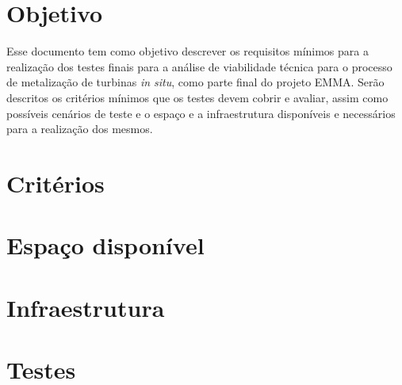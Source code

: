 \documentclass[12pt,a4paper]{article}
\begin{document}


\tableofcontents


\section{Objetivo}
Esse documento tem como objetivo descrever os requisitos mínimos para a
realização dos testes finais para a análise de viabilidade técnica para o
processo de metalização de turbinas \textit{in situ}, como parte final do
projeto EMMA.
Serão descritos os critérios mínimos que os testes devem cobrir e avaliar, assim
como possíveis cenários de teste e o espaço e a infraestrutura
disponíveis e necessários para a realização dos mesmos.

\section{Critérios}
\label{sec::criterios}


\section{Espaço disponível}


\section{Infraestrutura}


\section{Testes}

\end{document}
